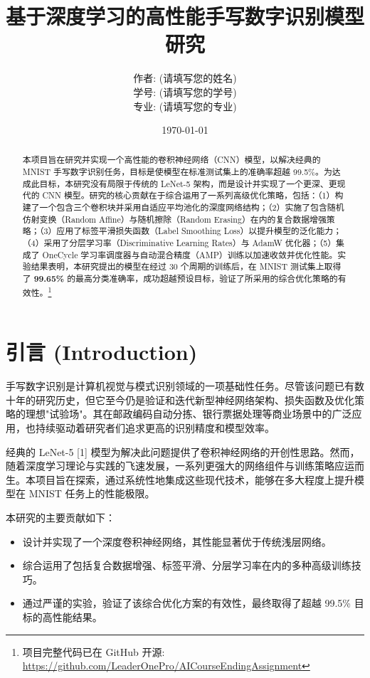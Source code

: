 \documentclass[UTF8]{ctexart}
\title{\textbf{基于深度学习的高性能手写数字识别模型研究}}
\author{作者: (请填写您的姓名) \\ 学号: (请填写您的学号) \\ 专业: (请填写您的专业)}
\date{\today}
\begin{document}
\maketitle
\thispagestyle{empty}

\begin{abstract}
\noindent
本项目旨在研究并实现一个高性能的卷积神经网络（CNN）模型，以解决经典的 MNIST 手写数字识别任务，目标是使模型在标准测试集上的准确率超越 99.5\%。为达成此目标，本研究没有局限于传统的 LeNet-5 架构，而是设计并实现了一个更深、更现代的 CNN 模型。研究的核心贡献在于综合运用了一系列高级优化策略，包括：（1）构建了一个包含三个卷积块并采用自适应平均池化的深度网络结构；（2）实施了包含随机仿射变换（Random Affine）与随机擦除（Random Erasing）在内的复合数据增强策略；（3）应用了标签平滑损失函数（Label Smoothing Loss）以提升模型的泛化能力；（4）采用了分层学习率（Discriminative Learning Rates）与 AdamW 优化器；（5）集成了 OneCycle 学习率调度器与自动混合精度（AMP）训练以加速收敛并优化性能。实验结果表明，本研究提出的模型在经过 30 个周期的训练后，在 MNIST 测试集上取得了 \textbf{99.65\%} 的最高分类准确率，成功超越预设目标，验证了所采用的综合优化策略的有效性。\footnote{项目完整代码已在 GitHub 开源: \url{https://github.com/LeaderOnePro/AICourseEndingAssignment}}
\end{abstract}

\section{引言 (Introduction)}

手写数字识别是计算机视觉与模式识别领域的一项基础性任务。尽管该问题已有数十年的研究历史，但它至今仍是验证和迭代新型神经网络架构、损失函数及优化策略的理想"试验场"。其在邮政编码自动分拣、银行票据处理等商业场景中的广泛应用，也持续驱动着研究者们追求更高的识别精度和模型效率。

经典的 LeNet-5 [1] 模型为解决此问题提供了卷积神经网络的开创性思路。然而，随着深度学习理论与实践的飞速发展，一系列更强大的网络组件与训练策略应运而生。本项目旨在探索，通过系统性地集成这些现代技术，能够在多大程度上提升模型在 MNIST 任务上的性能极限。

本研究的主要贡献如下：
\begin{itemize}
    \item 设计并实现了一个深度卷积神经网络，其性能显著优于传统浅层网络。
    \item 综合运用了包括复合数据增强、标签平滑、分层学习率在内的多种高级训练技巧。
    \item 通过严谨的实验，验证了该综合优化方案的有效性，最终取得了超越 99.5\% 目标的高性能结果。
\end{itemize}
\end{document}
